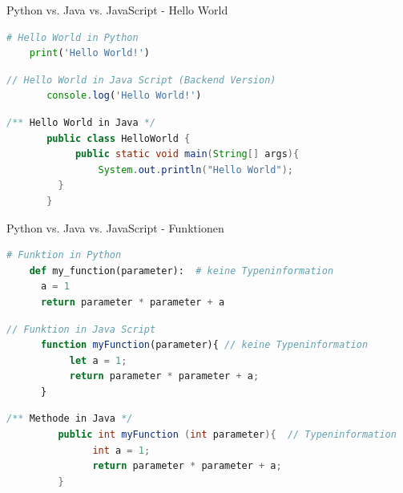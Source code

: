 \begin{frame}[fragile]{Python vs. Java vs. JavaScript - Hello World}
\begin{lstlisting}[language=Python]
	# Hello World in Python
 	print('Hello World!') 
\end{lstlisting}
\begin{lstlisting}[language=JavaScript]
       // Hello World in Java Script (Backend Version)
       console.log('Hello World!') 
\end{lstlisting}
\begin{lstlisting}[language=Java]
       /** Hello World in Java */
       public class HelloWorld {
      	    public static void main(String[] args){
                System.out.println("Hello World");
      	 }
       }
\end{lstlisting}
\end{frame}

\begin{frame}[fragile]{Python vs. Java vs. JavaScript - Funktionen}
\begin{lstlisting}[language=Python]
	# Funktion in Python
 	def my_function(parameter):  # keine Typeninformation
	  a = 1
	  return parameter * parameter + a
	\end{lstlisting}
\begin{lstlisting}[language=JavaScript]
       // Funktion in Java Script
 	  function myFunction(parameter){ // keine Typeninformation
	       let a = 1;
	       return parameter * parameter + a;
	  }
\end{lstlisting}
\begin{lstlisting}[language=Java]
       /** Methode in Java */
      	 public int myFunction (int parameter){  // Typeninformation
	           int a = 1;
	           return parameter * parameter + a;
         }
\end{lstlisting}
\end{frame}


